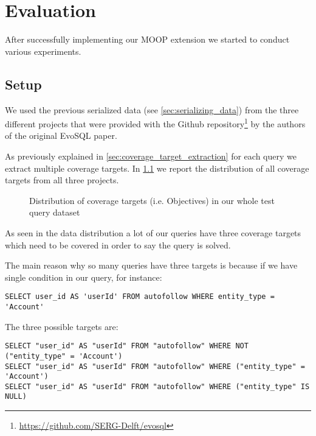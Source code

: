 \chapter{Evaluation}
\label{cha:evaluation}

After successfully implementing our MOOP extension we started to conduct various experiments.

\section{Setup}
\label{sec:experimental_setup}

We used the previous serialized data (see \cref{sec:serializing_data}) from the three different projects that were provided with the Github repository\footnote{\href{https://github.com/SERG-Delft/evosql}{https://github.com/SERG-Delft/evosql}} by the authors of the original EvoSQL paper. 

As previously explained in \cref{sec:coverage_target_extraction} for each query we extract multiple coverage targets. In \cref{fig:cov_targets_dist} we report the distribution of all coverage targets from all three projects.

\begin{figure}
	\centering
	\caption{Distribution of coverage targets (i.e. Objectives) in our whole test query dataset}
	\label{fig:cov_targets_dist}
\end{figure}

As seen in the data distribution a lot of our queries have three coverage targets which need to be covered in order to say the query is solved.

The main reason why so many queries have three targets is because if we have single condition in our query, for instance:
\begin{verbatim}
SELECT user_id AS 'userId' FROM autofollow WHERE entity_type = 'Account'
\end{verbatim}

The three possible targets are:
\begin{verbatim}
SELECT "user_id" AS "userId" FROM "autofollow" WHERE NOT ("entity_type" = 'Account')
SELECT "user_id" AS "userId" FROM "autofollow" WHERE ("entity_type" = 'Account')
SELECT "user_id" AS "userId" FROM "autofollow" WHERE ("entity_type" IS NULL)
\end{verbatim}

